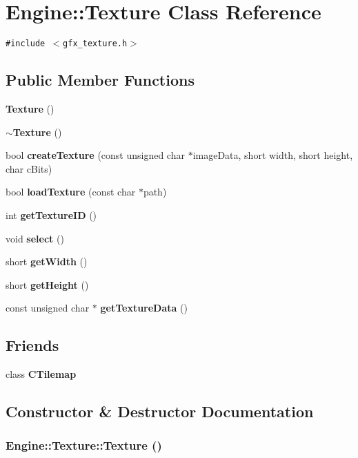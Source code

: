 \section{Engine::Texture Class Reference}
\label{classEngine_1_1Texture}
{\tt \#include $<$gfx\_\-texture.h$>$}

\subsection*{Public Member Functions}
\begin{CompactItemize}
\item 
{\bf Texture} ()
\item 
{\bf $\sim$Texture} ()
\item 
bool {\bf createTexture} (const unsigned char $\ast$imageData, short width, short height, char cBits)
\item 
bool {\bf loadTexture} (const char $\ast$path)
\item 
int {\bf getTextureID} ()
\item 
void {\bf select} ()
\item 
short {\bf getWidth} ()
\item 
short {\bf getHeight} ()
\item 
const unsigned char $\ast$ {\bf getTextureData} ()
\end{CompactItemize}
\subsection*{Friends}
\begin{CompactItemize}
\item 
class {\bf CTilemap}
\end{CompactItemize}


\subsection{Constructor \& Destructor Documentation}
\subsubsection{\setlength{\rightskip}{0pt plus 5cm}Engine::Texture::Texture ()\hspace{0.3cm}{\tt  [inline]}}\label{classEngine_1_1Texture_8f18f686fbb5bb6c90e3ed8c978f1a80}


